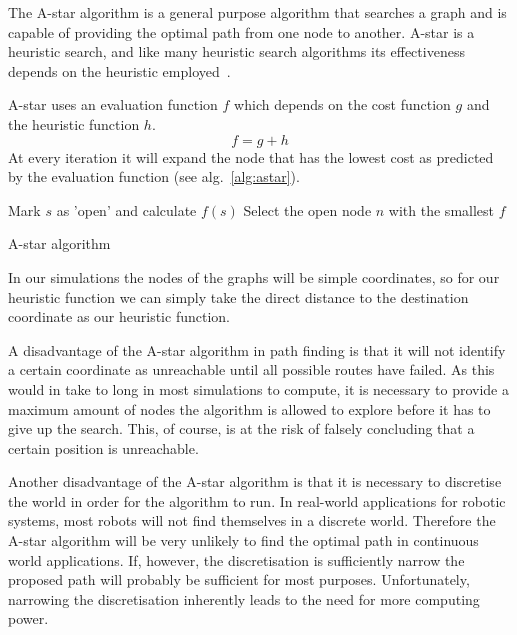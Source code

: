 			The A-star algorithm is a general purpose algorithm that searches a graph and is capable of providing the optimal path from one node to another. A-star is a heuristic search, and like many heuristic search algorithms its effectiveness depends on the heuristic employed~\cite{4082128}.

			A-star uses an evaluation function $f$ which depends on the cost function $g$ and the heuristic function $h$.
			\begin{equation}
				\label{eq:astarevaluation}
			 	f = g + h
			\end{equation} 
			At every iteration it will expand the node that has the lowest cost as predicted by the evaluation function (see alg.~\ref{alg:astar}).

			\begin{algorithm}
				Mark $s$ as 'open' and calculate $f(s)$\;
				Select the open node $n$ with the smallest $f$\;
				\caption{A-star algorithm~\protect\cite{4082128}}
				\label{alg:astar}
			\end{algorithm}

			In our simulations the nodes of the graphs will be simple coordinates, so for our heuristic function we can simply take the direct distance to the destination coordinate as our heuristic function.

			A disadvantage of the A-star algorithm in path finding is that it will not identify a certain coordinate as unreachable until all possible routes have failed. As this would in take to long in most simulations to compute, it is necessary to provide a maximum amount of nodes the algorithm is allowed to explore before it has to give up the search. This, of course, is at the risk of falsely concluding that a certain position is unreachable.

			Another disadvantage of the A-star algorithm is that it is necessary to discretise the world in order for the algorithm to run. In real-world applications for robotic systems, most robots will not find themselves in a discrete world. Therefore the A-star algorithm will be very unlikely to find the optimal path in continuous world applications. If, however, the discretisation is sufficiently narrow the proposed path will probably be sufficient for most purposes. Unfortunately, narrowing the discretisation inherently leads to the need for more computing power.


